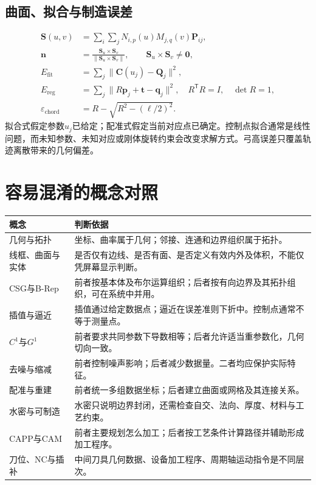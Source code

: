 \subsection*{曲面、拟合与制造误差}
\begin{align*}
\boldsymbol S(u,v)&=\sum_i\sum_jN_{i,p}(u)M_{j,q}(v)\boldsymbol P_{ij},\\
\boldsymbol n&=\frac{\boldsymbol S_u\times\boldsymbol S_v}
 {\|\boldsymbol S_u\times\boldsymbol S_v\|},
\qquad \boldsymbol S_u\times\boldsymbol S_v\ne\boldsymbol0,\\
E_{\mathrm{fit}}&=\sum_j\|\boldsymbol C(u_j)-\boldsymbol Q_j\|^2,\\
E_{\mathrm{reg}}&=\sum_j\|R\boldsymbol p_j+\boldsymbol t-\boldsymbol q_j\|^2,
\quad R^{\mathsf T}R=I,\quad\det R=1,\\
\varepsilon_{\mathrm{chord}}&=R-\sqrt{R^2-(\ell/2)^2}.
\end{align*}
拟合式假定参数$u_j$已给定；配准式假定当前对应点已确定。控制点拟合通常是线性问题，而未知参数、未知对应或刚体旋转约束会改变求解方式。弓高误差只覆盖轨迹离散带来的几何偏差。

\section{容易混淆的概念对照}
\begin{center}
\begin{tabularx}{\linewidth}{@{}p{.25\linewidth}X@{}}
\toprule
概念 & 判断依据\\
\midrule
几何与拓扑 & 坐标、曲率属于几何；邻接、连通和边界组织属于拓扑。\\
线框、曲面与实体 & 是否仅有边线、是否有面、是否定义有效内外及体积，不能仅凭屏幕显示判断。\\
CSG与B-Rep & 前者按基本体及布尔运算组织；后者按有向边界及其拓扑组织，可在系统中并用。\\
插值与逼近 & 插值通过给定数据点；逼近在误差准则下折中。控制点通常不等于测量点。\\
$C^1$与$G^1$ & 前者要求共同参数下导数相等；后者允许适当重参数化，几何切向一致。\\
去噪与缩减 & 前者控制噪声影响；后者减少数据量。二者均应保护实际特征。\\
配准与重建 & 前者统一多组数据坐标；后者建立曲面或网格及其连接关系。\\
水密与可制造 & 水密只说明边界封闭，还需检查自交、法向、厚度、材料与工艺约束。\\
CAPP与CAM & 前者主要规划怎么加工；后者按工艺条件计算路径并辅助形成加工程序。\\
刀位、NC与插补 & 中间刀具几何数据、设备加工程序、周期轴运动指令是不同层次。\\
\bottomrule
\end{tabularx}
\end{center}

